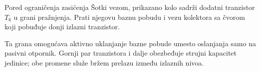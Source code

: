 Pored ograničenja zasićenja Šotki vezom, prikazano kolo sadrži dodatni tranzistor $T_6$ u grani pražnjenja. Prati njegovu baznu pobudu i vezu kolektora sa čvorom koji pobuđuje donji izlazni tranzistor.

Ta grana omogućava aktivno uklanjanje bazne pobude umesto oslanjanja samo na pasivni otpornik. Gornji par tranzistora i dalje obezbeđuje strujni kapacitet jedinice; obe promene služe bržem prelazu između izlaznih nivoa.

